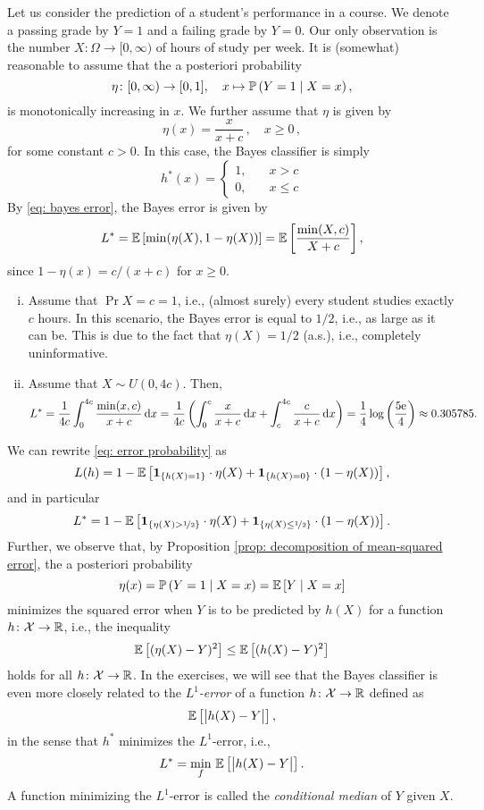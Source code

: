 \begin{example}
Let us consider the prediction of a student's performance in a course. We denote a passing grade by $Y=1$ and a failing grade by $Y=0$. Our only observation is the number $X \colon \Omega \to [0, \infty)$ of hours of study per week. It is (somewhat) reasonable to assume that the a posteriori probability
\[
    \eta \colon [0, \infty) \to [0, 1], \quad x \mapsto \mathbb{P}\left(Y = 1 \mathrel{|} X = x\right),
\]
is monotonically increasing in $x$. We further assume that $\eta$ is given by
\[
    \eta(x) = \frac{x}{x + c} \, , \quad x \geq 0 \, ,
\]
for some constant $c > 0$. In this case, the Bayes classifier is simply
\[
    h^*(x) = \begin{cases}
        1, \quad &x > c \\
        0, \quad &x \leq c
    \end{cases}
\]
By \eqref{eq: bayes error}, the Bayes error is given by
\[
    L^* = \mathbb{E}\left[\min(\eta(X), 1-\eta(X))\right] = \mathbb{E}\left[\frac{\min(X, c)}{X + c}\right],
\]
since $1 - \eta(x) = c / (x+c)$ for $x \geq 0$.

\begin{enumerate}[(i)]
    \item Assume that $\Pr{X = c} = 1$, i.e., (almost surely) every student studies exactly $c$ hours. In this scenario, the Bayes error is equal to $1/2$, i.e., as large as it can be. This is due to the fact that $\eta(X) = 1/2$ (a.s.), i.e., completely uninformative.
    
    \item Assume that $X \sim U(0, 4c)$. Then,
    \[
        L^* = \frac{1}{4c} \int_0^{4c} \frac{\min(x, c)}{x + c} \,\mathrm{d}x = \frac{1}{4c} \left( \int_0^c \frac{x}{x + c} \,\mathrm{d}x + \int_c^{4c} \frac{c}{x + c} \,\mathrm{d}x \right) = \frac{1}{4} \log\left(\frac{5\mathrm{e}}{4}\right) \approx 0.305785.
    \]
\end{enumerate}
\end{example}

\begin{remark}
We can rewrite \eqref{eq: error probability} as
\[
    L(h) = 1 - \mathbb{E}\left[\mathbf{1}_{\left\{h(X) = 1\right\}} \cdot \eta(X) + \mathbf{1}_{\left\{h(X) = 0\right\}} \cdot (1 - \eta(X))\right],
\]
and in particular
\[
    L^* = 1 - \mathbb{E}\left[\mathbf{1}_{\left\{\eta(X) > \nicefrac{1}{2}\right\}} \cdot \eta(X) + \mathbf{1}_{\left\{\eta(X) \leq \nicefrac{1}{2}\right\}} \cdot (1 - \eta(X))\right].
\]
Further, we observe that, by Proposition \ref{prop: decomposition of mean-squared error}, the a posteriori probability
\[
    \eta(x) = \mathbb{P}\left(Y=1 \mathrel{|} X=x\right) = \mathbb{E}\left[Y \mathrel{|} X=x\right]
\]
minimizes the squared error when $Y$ is to be predicted by $h(X)$ for a function $h \colon \mathcal{X} \to \mathbb{R}$, i.e., the inequality
\[
    \mathbb{E}\left[(\eta(X) - Y)^2\right] \leq \mathbb{E}\left[(h(X) - Y)^2\right]
\]
holds for all $h \colon \mathcal{X} \to \mathbb{R}$. In the exercises, we will see that the Bayes classifier is even more closely related to the \emph{$L^1$-error} of a function $h \colon \mathcal{X} \to \mathbb{R}$ defined as
\[
    \mathbb{E}\left[\big\lvert h(X) - Y \big\rvert\right],
\]
in the sense that $h^*$ minimizes the $L^1$-error, i.e.,
\[
    L^* = \min_f \, \mathbb{E}\left[\big\lvert h(X) - Y \big\rvert\right].
\]
A function minimizing the $L^1$-error is called the \emph{conditional median} of $Y$ given $X$.
\end{remark}

